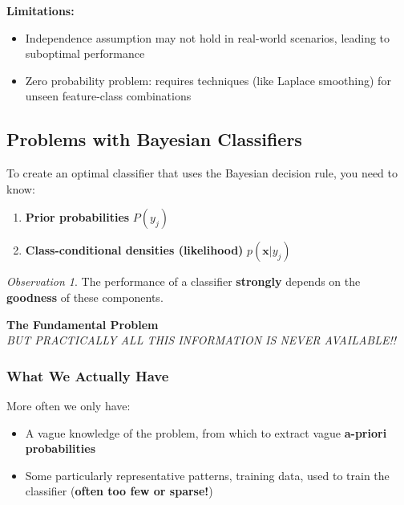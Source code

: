 \documentclass[11pt,a4paper]{article}
\theoremstyle{definition}
\theoremstyle{plain}
\theoremstyle{remark}
\newtheorem*{observation}{Observation}
\begin{document}
\textbf{Limitations:}
\begin{itemize}
    \item Independence assumption may not hold in real-world scenarios, leading to suboptimal performance
    \item Zero probability problem: requires techniques (like Laplace smoothing) for unseen feature-class combinations
\end{itemize}

\subsection{Problems with Bayesian Classifiers}

To create an optimal classifier that uses the Bayesian decision rule, you need to know:

\begin{enumerate}
    \item \textbf{Prior probabilities} $P(y_j)$
    \item \textbf{Class-conditional densities (likelihood)} $p(\mathbf{x}|y_j)$
\end{enumerate}

\begin{observation}
The performance of a classifier \textbf{strongly} depends on the \textbf{goodness} of these components.
\end{observation}

\begin{center}
\colorbox{red!20}{\parbox{0.9\textwidth}{
\centering
\textbf{The Fundamental Problem}\\[0.2cm]
\textit{BUT PRACTICALLY ALL THIS INFORMATION IS NEVER AVAILABLE!!}
}}
\end{center}

\subsubsection{What We Actually Have}

More often we only have:

\begin{itemize}
    \item A vague knowledge of the problem, from which to extract vague \textbf{a-priori probabilities}
    
    \item Some particularly representative patterns, training data, used to train the classifier (\textbf{often too few or sparse!})
\end{itemize}
\end{document}
